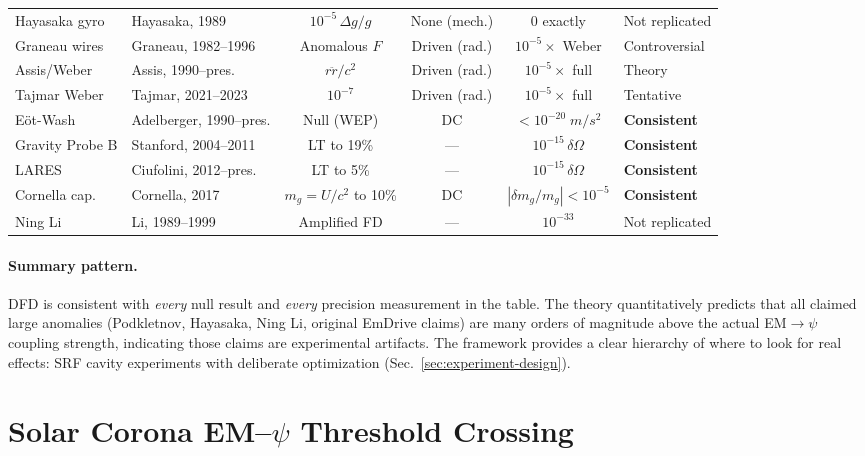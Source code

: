 \documentclass[aps,prd,twocolumn,superscriptaddress,floatfix,nofootinbib]{revtex4-2}
\begin{document}
\begin{table}[t]
\begin{ruledtabular}
\begin{tabular}{llcccl}
Hayasaka gyro & Hayasaka, 1989 &
$10^{-5}\,\Delta g/g$ & None (mech.) &
0 exactly & Not replicated \\
Graneau wires & Graneau, 1982--1996 &
Anomalous $F$ & Driven (rad.) &
$10^{-5}\times$ Weber & Controversial \\
Assis/Weber & Assis, 1990--pres. &
$r\ddot{r}/c^2$ & Driven (rad.) &
$10^{-5}\times$ full & Theory \\
Tajmar Weber & Tajmar, 2021--2023 &
$10^{-7}$ & Driven (rad.) &
$10^{-5}\times$ full & Tentative \\
E\"ot-Wash & Adelberger, 1990--pres. &
Null (WEP) & DC &
$< 10^{-20}\;\si{m/s^2}$ & \textbf{Consistent} \\
Gravity Probe B & Stanford, 2004--2011 &
LT to 19\% & --- &
$10^{-15}\,\delta\Omega$ & \textbf{Consistent} \\
LARES & Ciufolini, 2012--pres. &
LT to 5\% & --- &
$10^{-15}\,\delta\Omega$ & \textbf{Consistent} \\
Cornella cap. & Cornella, 2017 &
$m_g = U/c^2$ to 10\% & DC &
$|\delta m_g/m_g| < 10^{-5}$ & \textbf{Consistent} \\
Ning Li & Li, 1989--1999 &
Amplified FD & --- &
$10^{-33}$ & Not replicated \\
\end{tabular}
\end{ruledtabular}
\end{table}

\paragraph{Summary pattern.}
DFD is consistent with \emph{every} null result and \emph{every}
precision measurement in the table. The theory quantitatively predicts
that all claimed large anomalies (Podkletnov, Hayasaka, Ning Li,
original EmDrive claims) are many orders of magnitude above the actual
EM$\to\psi$ coupling strength, indicating those claims are experimental
artifacts. The framework provides a clear hierarchy of where to look
for real effects: SRF cavity experiments with deliberate optimization
(Sec.~\ref{sec:experiment-design}).


\section{Solar Corona EM--$\psi$ Threshold
Crossing}\label{sec:corona}
\end{document}
